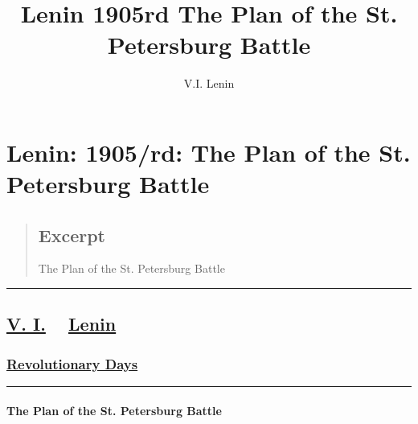 \documentclass[
]{article}
\title{Lenin 1905rd The Plan of the St. Petersburg Battle}
\author{V.I. Lenin}
\date{}
\begin{document}
\maketitle

\hypertarget{lenin-1905rd-the-plan-of-the-st.-petersburg-battle}{%
\section{Lenin: 1905/rd: The Plan of the St. Petersburg
Battle}\label{lenin-1905rd-the-plan-of-the-st.-petersburg-battle}}

\begin{quote}
\hypertarget{excerpt}{%
\subsection{Excerpt}\label{excerpt}}

The Plan of the St. Petersburg Battle
\end{quote}

\begin{center}\rule{0.5\linewidth}{0.5pt}\end{center}

\hypertarget{v.-i.-lenin}{%
\subsection{\texorpdfstring{\href{https://www.marxists.org/archive/lenin/works/1905/jan/25.htm}{V.
I.} ~
\href{https://www.marxists.org/archive/lenin/works/1905/jan/19b.htm}{Lenin}}{V. I. ~ Lenin}}\label{v.-i.-lenin}}

\hypertarget{revolutionary-days}{%
\subsubsection{\texorpdfstring{\href{https://www.marxists.org/archive/lenin/works/1905/rd/index.htm\#3}{Revolutionary
Days}}{Revolutionary Days}}\label{revolutionary-days}}

\begin{center}\rule{0.5\linewidth}{0.5pt}\end{center}

\hypertarget{the-plan-of-the-st.-petersburg-battle}{%
\paragraph{The Plan of the St. Petersburg
Battle}\label{the-plan-of-the-st.-petersburg-battle}}
\end{document}
